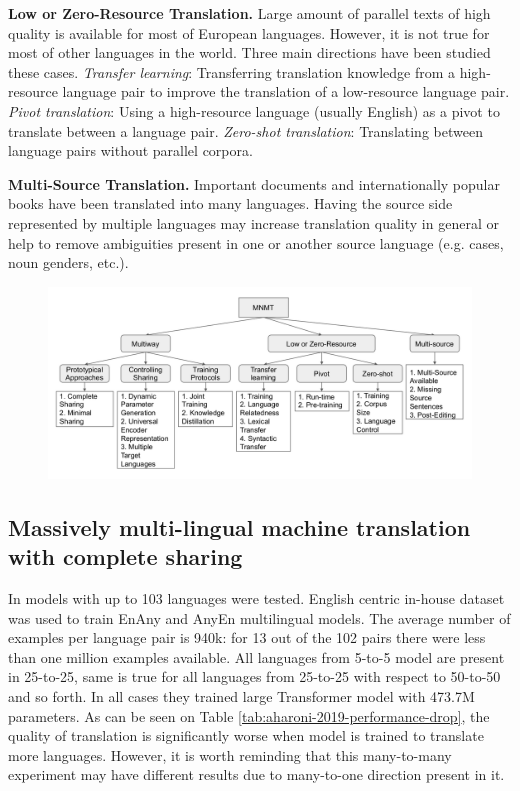 \textbf{Low or Zero-Resource Translation.}
Large amount of parallel texts of high quality is available for most of European
languages. However, it is not true for most of other languages in the world.
Three main directions have been studied these cases.
\textit{Transfer learning}: Transferring translation knowledge from a high-resource language pair
to improve the translation of a low-resource language pair.
\textit{Pivot translation}: Using a high-resource language (usually English) as a pivot to translate
between a language pair.
\textit{Zero-shot translation}: Translating between language pairs without parallel corpora.

\textbf{Multi-Source Translation.} Important documents and internationally popular books have
been translated into many languages. Having the source side represented by multiple languages
may increase translation quality in general or help to remove ambiguities present in one or another
source language (e.g. cases, noun genders, etc.).


\begin{figure}[h]
	\begin{minipage}{0.9\textwidth}
	\centering
	\includegraphics[width=1.0\columnwidth]{../img/dabre_2019_mnmt_categorized.png}
	\end{minipage}\hfill
	\label{fig:mnmt_categorized}
\end{figure}


\subsection{Massively multi-lingual machine translation with complete sharing}
\label{section:multitarget_theory}

In \cite{aharoni-etal-2019-massively} models with up to 103 languages were tested.
English centric in-house dataset was used to train En\to{}Any and Any\to{}En multilingual models.
The average number of examples per language pair is 940k:
for 13 out of the 102 pairs there were less than one million examples available.
All languages from 5-to-5 model are present in 25-to-25, same is true for all languages from 25-to-25 with respect to 50-to-50 and so forth.
In all cases they trained large Transformer model with 473.7M parameters.
As can be seen on Table \ref{tab:aharoni-2019-performance-drop}, the quality of translation
is significantly worse when model is trained to translate more languages.
However, it is worth reminding that this many-to-many experiment may have different results due to many-to-one direction present in it.

